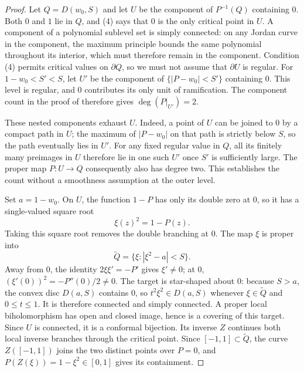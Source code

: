 \documentclass[11pt]{article}
\begin{document}
\begin{proof}
Let $Q=D(w_0,S)$ and let $U$ be the component of $P^{-1}(Q)$ containing
$0$.  Both $0$ and $1$ lie in $Q$, and (4) says that $0$ is the only critical
point in $U$.  A component of a polynomial sublevel set is simply connected: on any
Jordan curve in the component, the maximum principle bounds the same
polynomial throughout its interior, which must therefore remain in the
component. Condition (4) permits critical values on $\partial Q$, so
we must not assume that $\partial U$ is regular. For $1-w_0<S'<S$,
let $U'$ be the component of $\{|P-w_0|<S'\}$ containing $0$.
This level is regular, and $0$ contributes its only unit of ramification.
The component count in the proof of \cite[Proposition~2.1]{eks2010}
therefore gives $\deg(P|_{U'})=2$.

These nested components exhaust $U$. Indeed, a point of $U$ can be
joined to $0$ by a compact path in $U$; the maximum of $|P-w_0|$ on
that path is strictly below $S$, so the path eventually lies in $U'$.
For any fixed regular value in $Q$, all its finitely many preimages in
$U$ therefore lie in one such $U'$ once $S'$ is sufficiently large.
The proper map $P:U\to Q$ consequently also has degree two. This
establishes the count without a smoothness assumption at the outer level.

Set $a=1-w_0$.  On $U$, the function $1-P$ has only its double zero at $0$,
so it has a single-valued square root
\[
 \xi(z)^2=1-P(z).
\]
Taking this square root removes the double branching at $0$.
The map $\xi$ is proper into
\[
 \widetilde Q=\{\xi:|\xi^2-a|<S\}.
\]
Away from $0$, the identity $2\xi\xi'=-P'$ gives $\xi'\ne0$;
at $0$, $(\xi'(0))^2=-P''(0)/2\ne0$. The target is star-shaped about
$0$: because $S>a$, the convex disc $D(a,S)$ contains $0$, so
$t^2\xi^2\in D(a,S)$ whenever $\xi\in\widetilde Q$ and $0\le t\le1$.
It is therefore connected and simply connected. A proper local
biholomorphism has open and closed image, hence is a covering of this
target. Since $U$ is connected, it is a conformal bijection. Its inverse
$Z$ continues both local inverse branches through the critical point.  Since $[-1,1]\subset\widetilde Q$, the
curve $Z([-1,1])$ joins the two distinct points over $P=0$, and
$P(Z(\xi))=1-\xi^2\in[0,1]$ gives its containment.


\end{proof}
\end{document}
